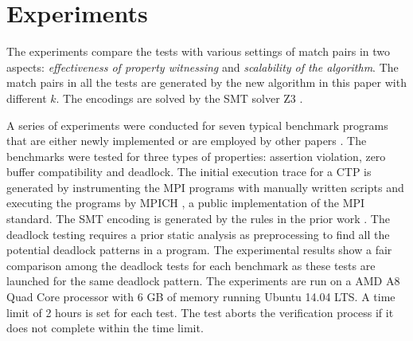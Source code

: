 \section{Experiments}
The experiments compare the tests with various settings of match pairs in two aspects: \textit{effectiveness of property witnessing} and \textit{scalability of the algorithm}.
The match pairs in all the tests are generated by the new algorithm in this paper with different $k$. 
The encodings are solved by the SMT solver Z3 \cite{demoura:tacas08}. 

A series of experiments were conducted for seven typical benchmark programs that are either newly implemented or are employed by other papers \cite{benchmark:fevs,mpptest_benchmark,DBLP:conf/kbse/HuangMM13,DBLP:conf/ppopp/XueLWGCZZV09}. The benchmarks were tested for three types of properties: assertion violation, zero buffer compatibility and deadlock. 
The initial execution trace for a CTP is generated by instrumenting the MPI programs with manually written scripts and executing the programs by MPICH \cite{mpich}, a public implementation of the MPI standard. The SMT encoding is generated by the rules in the prior work \cite{DBLP:conf/kbse/HuangMM13,HuangNFM15}. The deadlock testing requires a prior static analysis as preprocessing to find all the potential deadlock patterns in a program. 
The experimental results show a fair comparison among the deadlock tests for each benchmark as these tests are launched for the same deadlock pattern. 
The experiments are run on a AMD A8 Quad Core processor with 6 GB of memory running Ubuntu 14.04 LTS. A time limit of 2 hours is set for each test. The test aborts the verification process if it does not complete within the time limit.

